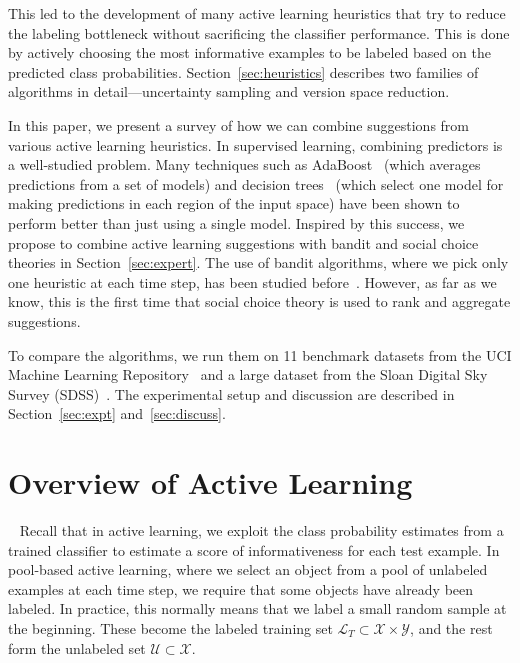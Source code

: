 \documentclass[fleqn,10pt,lineno]{wlpeerj} %
\newcommand{\X}{\mathcal{X}}
\newcommand{\Y}{\mathcal{Y}}
\newcommand{\Unlabeled}{\mathcal{U}}
\newcommand{\Labeled}{\mathcal{L}}
\begin{document}
This led to the development of many active learning heuristics that try to
reduce the labeling bottleneck without sacrificing the classifier performance.
This is done by actively choosing the most informative examples to be labeled
based on the predicted class probabilities. Section~\ref{sec:heuristics}
describes two families of algorithms in detail---uncertainty sampling and
version space reduction.

In this paper, we present a survey of how we can combine suggestions from
various active learning heuristics. In supervised learning, combining
predictors is a well-studied problem. Many techniques such as
AdaBoost~\citep{freund96} (which averages predictions from a set of models) and
decision trees~\citep{breiman84} (which select one model for making predictions
in each region of the input space) have been shown to perform better than just
using a single model. Inspired by this success, we propose to combine active
learning suggestions with bandit and social choice theories in
Section~\ref{sec:expert}. The use of bandit algorithms, where we pick only one
heuristic at each time step, has been studied before~\citep{baram04, hsu15}.
However, as far as we know, this is the first time that social choice theory is
used to rank and aggregate suggestions.

To compare the algorithms, we run them on 11 benchmark datasets from the UCI
Machine Learning Repository~\citep{lichman13} and a large dataset from the
Sloan Digital Sky Survey (SDSS)~\citep{alam15}. The experimental setup and
discussion are described in Section~\ref{sec:expt} and~\ref{sec:discuss}.


\section{Overview of Active Learning}~\label{sec:heuristics}
Recall that in active learning, we exploit the class probability estimates from
a trained classifier to estimate a score of informativeness for each test
example. In pool-based active learning, where we select an object from a pool
of unlabeled examples at each time step, we require that some objects have
already been labeled. In practice, this normally means that we label a small
random sample at the beginning. These become the labeled training set
$\Labeled_T \subset \X \times \Y$, and the rest form the unlabeled set
$\Unlabeled \subset \X$.
\end{document}
